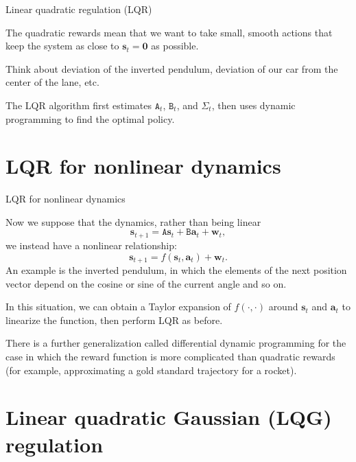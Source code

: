 \documentclass{beamer}
\renewcommand{\vec}[1]{\boldsymbol{#1}}
\newcommand{\mat}[1]{\mathtt{#1}}
\begin{document}
\begin{frame}{Linear quadratic regulation (LQR)}

  The quadratic rewards mean that we want to take \alert{small, smooth
  actions} that keep the system \alert{as close to $\vec{s}_t = \vec{0}$} as
  possible.

  \medskip

  Think about deviation of the inverted pendulum, deviation of our car
  from the center of the lane, etc.

  \medskip

  The \alert{LQR algorithm} first estimates $\mat{A}_t$, $\mat{B}_t$,
  and $\mat{\Sigma}_t$, then uses dynamic programming to find the
  optimal policy.
  
\end{frame}

\section{LQR for nonlinear dynamics}

\begin{frame}{LQR for nonlinear dynamics}

  Now we suppose that the dynamics, rather than being linear
  \[ \vec{s}_{t+1} = \mat{A}\vec{s}_{t} + \mat{B}\vec{a}_t + \vec{w}_t, \]
  we instead have a nonlinear relationship:
  \[ \vec{s}_{t+1} = f(\vec{s}_t,\vec{a}_t) + \vec{w}_t . \]
  An example is the inverted pendulum, in which the elements of the
  next position vector
  depend on the cosine or sine of the current angle and so on.

  \medskip

  In this situation, we can obtain a Taylor expansion of
  $f(\cdot,\cdot)$ around $\vec{s}_t$ and $\vec{a}_t$ to
  \alert{linearize} the function, then perform LQR as before.

  \medskip

  There is a further generalization called \alert{differential dynamic
    programming} for the case in which the reward function is more
  complicated than quadratic rewards (for example, approximating a
  gold standard trajectory for a rocket).

\end{frame}

\section{Linear quadratic Gaussian (LQG) regulation}
\end{document}
